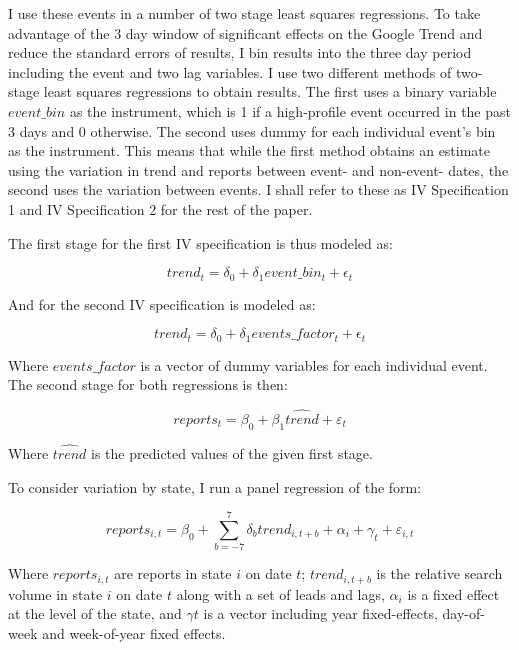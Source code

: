 \documentclass[AER,draftmode]{AEA}
\begin{document}
I use these events in a number of two stage least squares regressions. To take advantage of the 3 day window of significant effects on the Google Trend and reduce the standard errors of results, I bin results into the three day period including the event and two lag variables. I use two different methods of two-stage least squares regressions to obtain results. The first uses a binary variable $event\_bin$ as the instrument, which is 1 if a high-profile event occurred in the past 3 days and 0 otherwise. The second uses dummy for each individual event's bin as the instrument. This means that while the first method obtains an estimate using the variation in trend and reports between event- and non-event- dates, the second uses the variation between events. I shall refer to these as IV Specification 1 and IV Specification 2 for the rest of the paper.  

The first stage for the first IV specification is thus modeled as:

$$ 
trend_{t} = \delta_{0} + \delta_1 event\_bin_t + \epsilon_{t}
$$

And for the second IV specification is modeled as:

$$ 
trend_{t} = \delta_{0} + \delta_1 events\_factor_t + \epsilon_{t}
$$

Where $events\_factor$ is a vector of dummy variables for each individual event. The second stage for both regressions is then:

$$ 
reports_{t} = \beta_{0} + \beta_1 \hat{trend} + \varepsilon_{t}
$$

Where $\hat{trend}$ is the predicted values of the given first stage. 

To consider variation by state, I run a panel regression of the form:

$$ 
reports_{i,t} = \beta_{0} + \sum_{b=-7}^{7} \delta_{b} trend_{i,t+b} + \alpha_{i} + \gamma_{t} + \varepsilon_{i,t}
$$

Where $reports_{i,t}$ are reports in state $i$ on date $t$; $trend_{i,t+b}$ is the relative search volume in state $i$ on date $t$ along with a set of leads and lags, $\alpha_{i}$ is a fixed effect at the level of the state, and $\gamma{t}$ is a vector including year fixed-effects, day-of-week and week-of-year fixed effects. 
\end{document}

